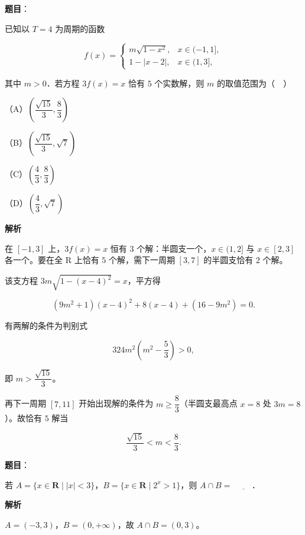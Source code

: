 \begin{answer}

\textbf{题目}：

已知以 $T=4$ 为周期的函数

\nopagebreak[4]
\[f(x)=\begin{cases}m\sqrt{1-x^2},&x\in(-1,1],\\ 1-|x-2|,&x\in(1,3],\end{cases}\]

其中 $m>0$．若方程 $3f(x)=x$ 恰有 $5$ 个实数解，则 $m$ 的取值范围为（　）

（A）$\left(\dfrac{\sqrt{15}}3,\dfrac83\right)$

（B）$\left(\dfrac{\sqrt{15}}3,\sqrt7\right)$

（C）$\left(\dfrac43,\dfrac83\right)$

（D）$\left(\dfrac43,\sqrt7\right)$

\textbf{解析}

在 $[-1,3]$ 上，$3f(x)=x$ 恒有 $3$ 个解：半圆支一个，$x\in(1,2]$ 与 $x\in[2,3]$ 各一个。要在全 R 上恰有 $5$ 个解，需下一周期 $[3,7]$ 的半圆支恰有 $2$ 个解。

该支方程 $3m\sqrt{1-(x-4)^2}=x$，平方得

\nopagebreak[4]
\[(9m^2+1)(x-4)^2+8(x-4)+(16-9m^2)=0.\]

有两解的条件为判别式

\nopagebreak[4]
\[324m^2\left(m^2-\frac53\right)>0,\]

即 $m>\dfrac{\sqrt{15}}3$。

再下一周期 $[7,11]$ 开始出现解的条件为 $m\geqslant\dfrac83$（半圆支最高点 $x=8$ 处 $3m=8$）。故恰有 $5$ 解当

\nopagebreak[4]
\[\frac{\sqrt{15}}3<m<\frac83.\]


\end{answer}
\begin{answer}

\textbf{题目}：

若 $A=\{x\in\mathbf R\mid |x|<3\}$，$B=\{x\in\mathbf R\mid 2^x>1\}$，则 $A\cap B=$ $\underline{\qquad}$．

\textbf{解析}

$A=(-3,3)$，$B=(0,+\infty)$，故 $A\cap B=(0,3)$。


\end{answer}
